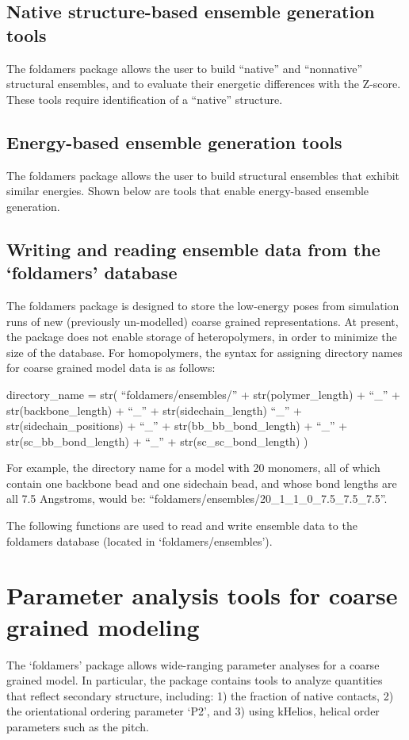 \documentclass[letterpaper,12pt,english,openany,oneside]{sphinxmanual}
\begin{document}
\section{Native structure-based ensemble generation tools}
\label{\detokenize{ensembles:native-structure-based-ensemble-generation-tools}}
The foldamers package allows the user to build “native” and “nonnative” structural ensembles, and to evaluate their energetic differences with the Z-score.  These tools require identification of a “native” structure.


\section{Energy-based ensemble generation tools}
\label{\detokenize{ensembles:energy-based-ensemble-generation-tools}}
The foldamers package allows the user to build structural ensembles that exhibit similar energies.  Shown below are tools that enable energy-based ensemble generation.


\section{Writing and reading ensemble data from the ‘foldamers’ database}
\label{\detokenize{ensembles:writing-and-reading-ensemble-data-from-the-foldamers-database}}
The foldamers package is designed to store the low-energy poses from simulation runs of new (previously un-modelled) coarse grained representations.  At present, the package does not enable storage of heteropolymers, in order to minimize the size of the database.  For homopolymers, the syntax for assigning directory names for coarse grained model data is as follows:

directory\_name = str( “foldamers/ensembles/” + str(polymer\_length) + “\_” + str(backbone\_length) + “\_” + str(sidechain\_length) “\_” + str(sidechain\_positions) + “\_” + str(bb\_bb\_bond\_length) + “\_” + str(sc\_bb\_bond\_length) + “\_” + str(sc\_sc\_bond\_length) )

For example, the directory name for a model with 20 monomers, all of which contain one backbone bead and one sidechain bead, and whose bond lengths are all 7.5 Angstroms, would be: “foldamers/ensembles/20\_1\_1\_0\_7.5\_7.5\_7.5”.

The following functions are used to read and write ensemble data to the foldamers database (located in ‘foldamers/ensembles’).


\chapter{Parameter analysis tools for coarse grained modeling}
\label{\detokenize{parameters:parameter-analysis-tools-for-coarse-grained-modeling}}\label{\detokenize{parameters::doc}}
The ‘foldamers’ package allows wide-ranging parameter analyses for a coarse grained model.  In particular, the package contains tools to analyze quantities that reflect secondary structure, including: 1) the fraction of native contacts, 2) the orientational ordering parameter ‘P2’, and 3) using kHelios, helical order parameters such as the pitch.
\end{document}

